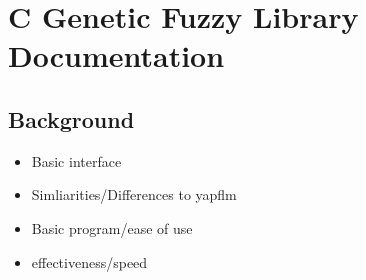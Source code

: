\chapter{C Genetic Fuzzy Library Documentation}
\section{Background}
\begin{itemize}
    \item Basic interface
    \item Simliarities/Differences to yapflm
    \item Basic program/ease of use
    \item effectiveness/speed
\end{itemize}

